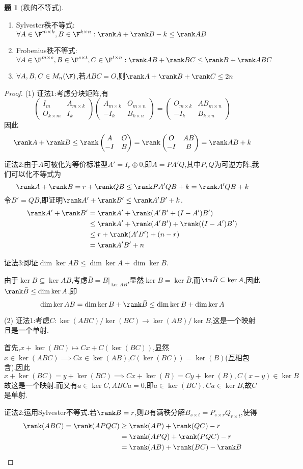 \documentclass{article}
\newcommand{\matrixtwo}[4]{\begin{pmatrix}#1&#2\\#3&#4 \end{pmatrix}}
\theoremstyle{definition}
\newtheorem{exercise}{题}[section]
\begin{document}
\begin{exercise}[秩的不等式]
\begin{enumerate}
    \item Sylvester秩不等式:$\forall A\in \F^{m\times k}, B\in \F^{k\times n}:\rank A+\rank B-k\leq \rank AB$
    \item Frobenius秩不等式:$\forall A\in \F^{m\times s}, B\in \F^{s\times t}, C\in \F^{t\times n}:\rank AB+\rank BC\leq \rank B+\rank ABC$
    \item $\forall A,B,C\in M_n(\F)$,若$ABC=O$,则$\rank A+\rank B+\rank C\leq 2n$
\end{enumerate}
\end{exercise}
\begin{proof}
    (1) 证法1:考虑分块矩阵,有$$\matrixtwo{I_m}{A_{m\times k}}{O_{k\times m}}{I_k} \matrixtwo{A_{m\times k}}{O_{m\times n}}{-I_k}{B_{k\times n}}=\matrixtwo{O_{m\times k}}{AB_{m\times n}}{-I_k}{B_{k\times n}}$$
    因此$$\rank A+\rank B\leq \rank\matrixtwo{A}{O}{-I}{B}=\rank\matrixtwo{O}{AB}{-I}{B}=\rank AB+k$$

    证法2:由于$A$可被化为等价标准型$A'=I_r\oplus 0$,即$A=PA'Q$,其中$P,Q$为可逆方阵,我们可以化不等式为$$\rank A+\rank B=r+\rank QB\leq \rank PA'QB+k=\rank A'QB+k$$
    令$B'=QB$,即证明$\rank A'+\rank B'\leq \rank A'B'+k$.
    $$\begin{aligned}
       \rank A'+\rank B'&=\rank A'+\rank(A'B'+(I-A')B')\\&\leq \rank A'+\rank (A'B')+\rank((I-A')B')\\&\leq r+\rank (A'B')+(n-r)\\&=\rank A'B'+n
    \end{aligned}$$

    证法3:即证$\dim \ker AB\leq \dim \ker A+\dim \ker B$.

    由于$\ker B\subseteq \ker AB$,考虑$\bar{B}=B|_{\ker AB}$,显然$\ker B=\ker \bar{B}$,而$\im \bar{B}\subseteq \ker A$,因此$\rank \bar{B}\leq \dim\ker A$,即$$\dim\ker AB=\dim \ker B+\rank \bar{B}\leq \dim \ker B+\dim\ker A$$

    (2) 证法1:考虑$C:\ker(ABC)/\ker(BC)\to \ker(AB)/\ker B$,这是一个映射且是一个单射.

    首先,$x+\ker(BC)\mapsto Cx+C(\ker (BC))$,显然$x\in\ker(ABC)\implies Cx\in \ker(AB)$,$C(\ker(BC))=\ker(B)$(互相包含),因此$$x+\ker(BC)=y+\ker(BC)\implies Cx+\ker(B)=Cy+\ker(B),C(x-y)\in\ker B$$故这是一个映射.而又有$a\in\ker C, ABCa=0$,即$a\in\ker (BC), Ca\in \ker B$,故$C$是单射.

    证法2:运用Sylvester不等式.若$\rank B=r$,则$B$有满秩分解$B_{s\times t}=P_{s\times r}Q_{r\times t}$,使得
    $$\begin{aligned}
        \rank(ABC)=\rank(APQC)&\geq \rank(AP)+\rank (QC)-r\\&=\rank(APQ)+\rank(PQC)-r\\&=\rank (AB)+\rank (BC)-\rank B
    \end{aligned}$$


\end{proof}
\end{document}
